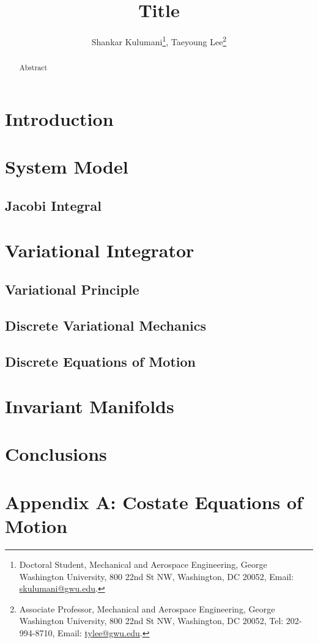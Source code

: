 \documentclass[letterpaper, paper,11pt]{AAS}		%
\begin{document}
\title{Title}

\author{Shankar Kulumani\thanks{Doctoral Student, Mechanical and Aerospace Engineering, George Washington University, 800 22nd St NW, Washington, DC 20052, Email: \href{mailto:skulumani@gwu.edu}{skulumani@gwu.edu}.},  
Taeyoung Lee\thanks{Associate Professor, Mechanical and Aerospace Engineering, George Washington University, 800 22nd St NW, Washington, DC 20052, Tel: 202-994-8710, Email: \href{mailto:tylee@gwu.edu}{tylee@gwu.edu}.}
}


\maketitle{} 		


\begin{abstract}
Abstract
\end{abstract}

\section{Introduction}\label{sec:introduction}




\section{System Model}\label{sec:pcrtbp}

\subsection{Jacobi Integral}

\section{Variational Integrator}\label{sec:discrete_var}

\subsection{Variational Principle}

\subsection{Discrete Variational Mechanics}

\subsection{Discrete Equations of Motion}

\section{Invariant Manifolds} \label{sec:invariant_manifold}

\section{Conclusions}\label{sec:conclusion}

 


\appendix
\section*{Appendix A: Costate Equations of Motion}\label{sec:costate_appendix}
\end{document}
